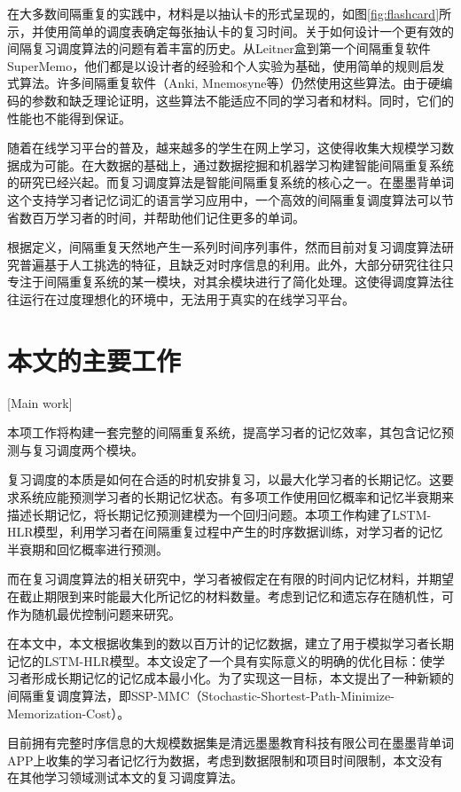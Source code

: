 在大多数间隔重复的实践中，材料是以抽认卡的形式呈现的，如图\ref{fig:flashcard}所示，并使用简单的调度表确定每张抽认卡的复习时间。关于如何设计一个更有效的间隔复习调度算法的问题有着丰富的历史。从Leitner盒到第一个间隔重复软件SuperMemo，他们都是以设计者的经验和个人实验为基础，使用简单的规则启发式算法。许多间隔重复软件（Anki, Mnemosyne等）仍然使用这些算法。由于硬编码的参数和缺乏理论证明，这些算法不能适应不同的学习者和材料。同时，它们的性能也不能得到保证。

随着在线学习平台的普及，越来越多的学生在网上学习，这使得收集大规模学习数据成为可能。在大数据的基础上，通过数据挖掘和机器学习构建智能间隔重复系统的研究已经兴起。而复习调度算法是智能间隔重复系统的核心之一。在墨墨背单词这个支持学习者记忆词汇的语言学习应用中，一个高效的间隔重复调度算法可以节省数百万学习者的时间，并帮助他们记住更多的单词。

根据定义，间隔重复天然地产生一系列时间序列事件，然而目前对复习调度算法研究普遍基于人工挑选的特征，且缺乏对时序信息的利用。此外，大部分研究往往只专注于间隔重复系统的某一模块，对其余模块进行了简化处理。这使得调度算法往往运行在过度理想化的环境中，无法用于真实的在线学习平台。

\section{本文的主要工作}[Main work]

本项工作将构建一套完整的间隔重复系统，提高学习者的记忆效率，其包含记忆预测与复习调度两个模块。

复习调度的本质是如何在合适的时机安排复习，以最大化学习者的长期记忆。这要求系统应能预测学习者的长期记忆状态。有多项工作\cite{settlesTrainableSpacedRepetition2016,zaidiAdaptiveForgettingCurves2020}使用回忆概率和记忆半衰期来描述长期记忆，将长期记忆预测建模为一个回归问题。本项工作构建了LSTM-HLR模型，利用学习者在间隔重复过程中产生的时序数据训练，对学习者的记忆半衰期和回忆概率进行预测。

而在复习调度算法的相关研究中，学习者被假定在有限的时间内记忆材料，并期望在截止期限到来时能最大化所记忆的材料数量\cite{reddyAcceleratingHumanLearning2017}。考虑到记忆和遗忘存在随机性，可作为随机最优控制问题来研究。

在本文中，本文根据收集到的数以百万计的记忆数据，建立了用于模拟学习者长期记忆的LSTM-HLR模型。本文设定了一个具有实际意义的明确的优化目标：使学习者形成长期记忆的记忆成本最小化。为了实现这一目标，本文提出了一种新颖的间隔重复调度算法，即SSP-MMC（Stochastic-Shortest-Path-Minimize-Memorization-Cost）。

目前拥有完整时序信息的大规模数据集是清远墨墨教育科技有限公司在墨墨背单词APP上收集的学习者记忆行为数据，考虑到数据限制和项目时间限制，本文没有在其他学习领域测试本文的复习调度算法。

